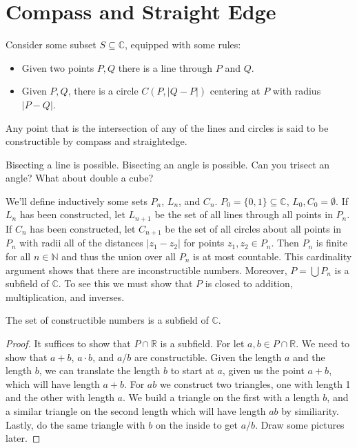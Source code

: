 \documentclass{article}                                                        %
\begin{document}
    \section{Compass and Straight Edge}
        Consider some subset $S\subseteq\mathbb{C}$, equipped with some rules:
        \begin{itemize}
            \item Given two points $P,Q$ there is a line through $P$ and $Q$.
            \item Given $P,Q$, there is a circle $C(P,|Q-P|)$ centering at $P$
                  with radius $|P-Q|$.
        \end{itemize}
        Any point that is the intersection of any of the lines and circles is
        said to be constructible by compass and straightedge.
        \begin{example}
            Bisecting a line is possible. Bisecting an angle is possible. Can
            you trisect an angle? What about double a cube?
        \end{example}
        We'll define inductively some sets $P_{n}$, $L_{n}$, and $C_{n}$.
        $P_{0}=\{0,1\}\subseteq\mathbb{C}$, $L_{0},C_{0}=\emptyset$. If
        $L_{n}$ has been constructed, let $L_{n+1}$ be the set of all lines
        through all points in $P_{n}$. If $C_{n}$ has been constructed, let
        $C_{n+1}$ be the set of all circles about all points in $P_{n}$ with
        radii all of the distances $|z_{1}-z_{2}|$ for points
        $z_{1},z_{2}\in{P}_{n}$. Then $P_{n}$ is finite for all $n\in\mathbb{N}$
        and thus the union over all $P_{n}$ is at most countable. This
        cardinality argument shows that there are inconstructible numbers.
        Moreover, $P=\bigcup{P}_{n}$ is a subfield of $\mathbb{C}$. To see this
        we must show that $P$ is closed to addition, multiplication, and
        inverses.
        \begin{theorem}
            The set of constructible numbers is a subfield of $\mathbb{C}$.
        \end{theorem}
        \begin{proof}
            It suffices to show that $P\cap\mathbb{R}$ is a subfield. For let
            $a,b\in{P}\cap\mathbb{R}$. We need to show that $a+b$, $a\cdot{b}$,
            and $a/b$ are constructible. Given the length $a$ and the length
            $b$, we can translate the length $b$ to start at $a$, given us the
            point $a+b$, which will have length $a+b$. For $ab$ we construct
            two triangles, one with length 1 and the other with length $a$.
            We build a triangle on the first with a length $b$, and a similar
            triangle on the second length which will have length $ab$ by
            similiarity. Lastly, do the same triangle with $b$ on the inside to
            get $a/b$. Draw some pictures later.
        \end{proof}
\end{document}
